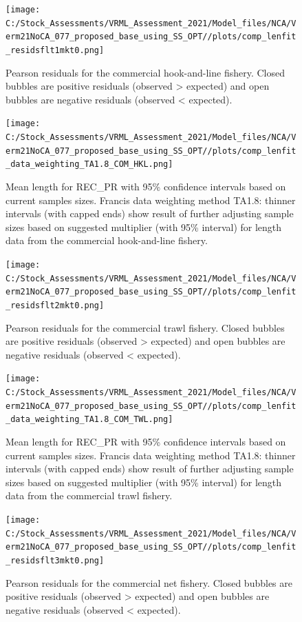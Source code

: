 \documentclass[
  english,
  a4paper,
]{article}
\begin{document}
\FloatBarrier

\begin{figure}
\centering
\texttt{[image: C:/Stock\_Assessments/VRML\_Assessment\_2021/Model\_files/NCA/Verm21NoCA\_077\_proposed\_base\_using\_SS\_OPT//plots/comp\_lenfit\_residsflt1mkt0.png]}
\caption{Pearson residuals for the commercial hook-and-line fishery. Closed bubbles are positive residuals (observed \textgreater{} expected) and open bubbles are negative residuals (observed \textless{} expected).\label{fig:len-pearson-COM-HKL}}
\end{figure}

\begin{figure}
\centering
\texttt{[image: C:/Stock\_Assessments/VRML\_Assessment\_2021/Model\_files/NCA/Verm21NoCA\_077\_proposed\_base\_using\_SS\_OPT//plots/comp\_lenfit\_data\_weighting\_TA1.8\_COM\_HKL.png]}
\caption{Mean length for REC\_PR with 95\% confidence intervals based on current samples sizes. Francis data weighting method TA1.8: thinner intervals (with capped ends) show result of further adjusting sample sizes based on suggested multiplier (with 95\% interval) for length data from the commercial hook-and-line fishery.\label{fig:mean-len-fit-COM-HKL}}
\end{figure}

\begin{figure}
\centering
\texttt{[image: C:/Stock\_Assessments/VRML\_Assessment\_2021/Model\_files/NCA/Verm21NoCA\_077\_proposed\_base\_using\_SS\_OPT//plots/comp\_lenfit\_residsflt2mkt0.png]}
\caption{Pearson residuals for the commercial trawl fishery. Closed bubbles are positive residuals (observed \textgreater{} expected) and open bubbles are negative residuals (observed \textless{} expected).\label{fig:len-pearson-COM-TWL}}
\end{figure}

\begin{figure}
\centering
\texttt{[image: C:/Stock\_Assessments/VRML\_Assessment\_2021/Model\_files/NCA/Verm21NoCA\_077\_proposed\_base\_using\_SS\_OPT//plots/comp\_lenfit\_data\_weighting\_TA1.8\_COM\_TWL.png]}
\caption{Mean length for REC\_PR with 95\% confidence intervals based on current samples sizes. Francis data weighting method TA1.8: thinner intervals (with capped ends) show result of further adjusting sample sizes based on suggested multiplier (with 95\% interval) for length data from the commercial trawl fishery.\label{fig:mean-len-fit-COM-TWL}}
\end{figure}

\begin{figure}
\centering
\texttt{[image: C:/Stock\_Assessments/VRML\_Assessment\_2021/Model\_files/NCA/Verm21NoCA\_077\_proposed\_base\_using\_SS\_OPT//plots/comp\_lenfit\_residsflt3mkt0.png]}
\caption{Pearson residuals for the commercial net fishery. Closed bubbles are positive residuals (observed \textgreater{} expected) and open bubbles are negative residuals (observed \textless{} expected).\label{fig:len-pearson-COM-NET}}
\end{figure}
\end{document}
